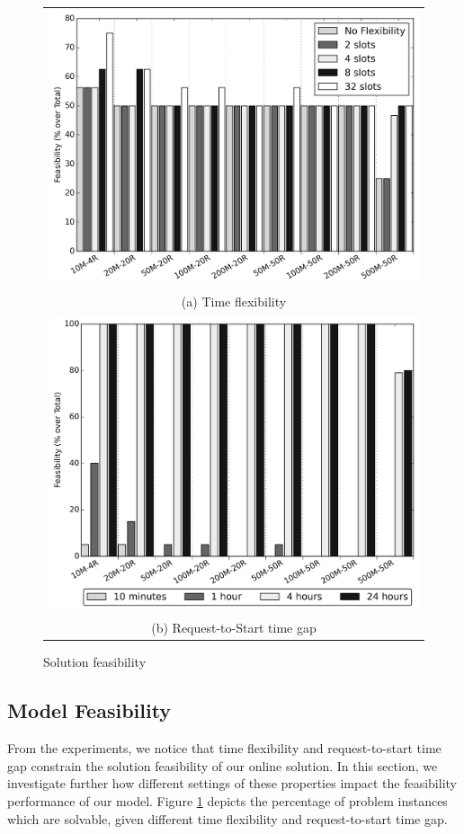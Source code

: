 \begin{figure}
\centering
\begin{tabular}{c}
  \includegraphics[width=0.8\linewidth]{figs/feasibility_tf_def_mtd.png} \\
(a) Time flexibility \\[6pt]
  \includegraphics[width=0.8\linewidth]{figs/feasibility_cvs_def_mtd.png} \\
(b) Request-to-Start time gap \\[6pt]
\end{tabular}
\caption{Solution feasibility}
\label{fig:def_feas}
\end{figure}


\subsection{Model Feasibility}

From the experiments, we notice that time flexibility and request-to-start time gap constrain the solution feasibility of our online solution. In this section, we investigate further how different settings of these properties impact the feasibility performance of our model. Figure \ref{fig:def_feas} depicts the percentage of problem instances which are solvable, given different time flexibility and request-to-start time gap. 

